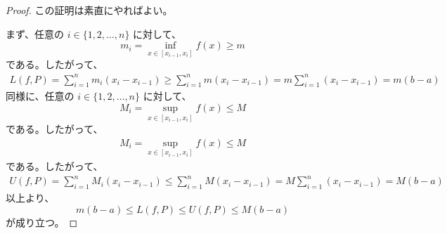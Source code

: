 \documentclass[article,paper=a4paper]{jlreq}
\begin{document}
\begin{proof}
この証明は素直にやればよい。

まず、任意の $i \in \{1, 2, \ldots, n\}$ に対して、 
\[m_i = \inf_{x \in [x_{i-1}, x_i]} f(x) \geq m\]
である。したがって、
\begin{align*}
    L(f,P) = \sum_{i=1}^n m_i (x_i - x_{i-1}) \geq \sum_{i=1}^n m (x_i - x_{i-1}) = m \sum_{i=1}^n (x_i - x_{i-1}) = m(b-a) 
\end{align*}
同様に、任意の $i \in \{1, 2, \ldots, n\}$ に対して、
\[M_i = \sup_{x \in [x_{i-1}, x_i]} f(x) \leq M\]
 である。したがって、
\begin{align*}
    M_i = \sup_{x \in [x_{i-1}, x_i]} f(x) \leq M
\end{align*}
である。したがって、
\begin{align*}
    U(f,P) = \sum_{i=1}^n M_i (x_i - x_{i-1}) \leq \sum_{i=1}^n M (x_i - x_{i-1}) = M \sum_{i=1}^n (x_i - x_{i-1}) = M(b-a) 
\end{align*}
以上より、
\[m(b-a) \leq L(f,P) \leq U(f,P) \leq M(b-a)\]
が成り立つ。
\end{proof}
\end{document}
